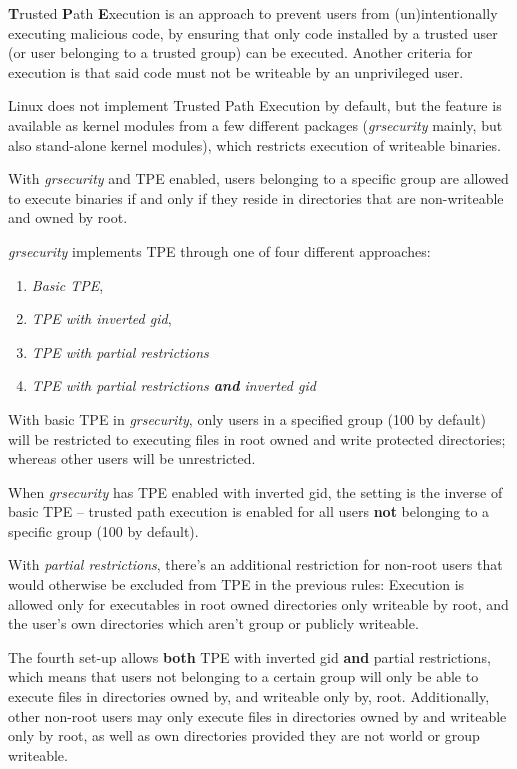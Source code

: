 \textbf{T}rusted \textbf{P}ath \textbf{E}xecution is an approach to prevent users from (un)intentionally executing malicious code, by ensuring that only code installed by a trusted user (or user belonging to a trusted group) can be executed. Another criteria for execution is that said code must not be writeable by an unprivileged user.\cite{usenixTPE}


Linux does not implement Trusted Path Execution by default, but the feature is available as kernel modules from a few different packages (\textit{grsecurity} \cite{grsecTPE} mainly, but also stand-alone kernel modules\cite{lkmTPE}), which restricts execution of writeable binaries.

With \textit{grsecurity} and TPE enabled, users belonging to a specific group are allowed to execute binaries if and only if they reside in directories that are non-writeable and owned by root. 

\textit{grsecurity} implements TPE through one of four different approaches:
\begin{enumerate}
 \item \textit{Basic TPE}, 
 \item \textit{TPE with inverted gid}, 
 \item \textit{TPE with partial restrictions}
 \item \textit{TPE with partial restrictions \textbf{and} inverted gid}
\end{enumerate} 

With basic TPE in \textit{grsecurity}, only users in a specified group (100 by default) will be restricted to executing files in root owned and write protected directories; whereas other users will be unrestricted.

When \textit{grsecurity} has TPE enabled with inverted gid, the setting is the inverse of basic TPE – trusted path execution is enabled for all users \textbf{not} belonging to a specific group (100 by default).

With \textit{partial restrictions}, there's an additional restriction for non-root users that would otherwise be excluded from TPE in the previous rules: Execution is allowed only for executables in root owned directories only writeable by root, and the user's own directories which aren't group or publicly writeable.

The fourth set-up allows \textbf{both} TPE with inverted gid \textbf{and} partial restrictions, which means that users not belonging to a certain group will only be able to execute files in directories owned by, and writeable only by, root. Additionally, other non-root users may only execute files in directories owned by and writeable only by root, as well as own directories provided they are not world or group writeable. \cite{grsecTPE}


